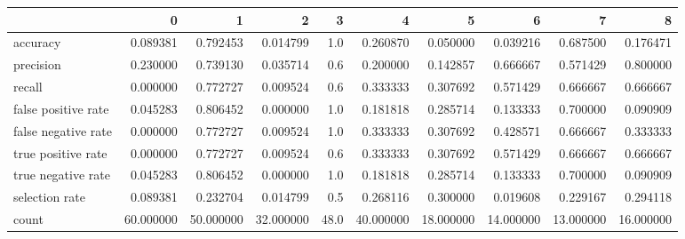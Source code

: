 \begin{tabular}{lrrrrrrrrr}
\toprule
{} &          0 &          1 &          2 &     3 &          4 &          5 &          6 &          7 &          8 \\
\midrule
accuracy            &   0.089381 &   0.792453 &   0.014799 &   1.0 &   0.260870 &   0.050000 &   0.039216 &   0.687500 &   0.176471 \\
precision           &   0.230000 &   0.739130 &   0.035714 &   0.6 &   0.200000 &   0.142857 &   0.666667 &   0.571429 &   0.800000 \\
recall              &   0.000000 &   0.772727 &   0.009524 &   0.6 &   0.333333 &   0.307692 &   0.571429 &   0.666667 &   0.666667 \\
false positive rate &   0.045283 &   0.806452 &   0.000000 &   1.0 &   0.181818 &   0.285714 &   0.133333 &   0.700000 &   0.090909 \\
false negative rate &   0.000000 &   0.772727 &   0.009524 &   1.0 &   0.333333 &   0.307692 &   0.428571 &   0.666667 &   0.333333 \\
true positive rate  &   0.000000 &   0.772727 &   0.009524 &   0.6 &   0.333333 &   0.307692 &   0.571429 &   0.666667 &   0.666667 \\
true negative rate  &   0.045283 &   0.806452 &   0.000000 &   1.0 &   0.181818 &   0.285714 &   0.133333 &   0.700000 &   0.090909 \\
selection rate      &   0.089381 &   0.232704 &   0.014799 &   0.5 &   0.268116 &   0.300000 &   0.019608 &   0.229167 &   0.294118 \\
count               &  60.000000 &  50.000000 &  32.000000 &  48.0 &  40.000000 &  18.000000 &  14.000000 &  13.000000 &  16.000000 \\
\bottomrule
\end{tabular}
